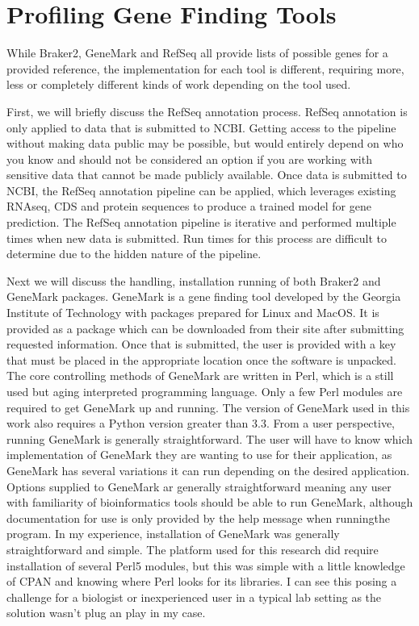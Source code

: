 \section{Profiling Gene Finding Tools}

While Braker2, GeneMark and RefSeq all provide lists of possible genes
for a provided reference, the implementation for each tool is
different, requiring more, less or completely different kinds of work
depending on the tool used.

First, we will briefly discuss the RefSeq annotation process. RefSeq
annotation is only applied to data that is submitted to NCBI. Getting
access to the pipeline without making data public may be possible, but
would entirely depend on who you know and should not be considered an
option if you are working with sensitive data that cannot be made
publicly available. Once data is submitted to NCBI, the RefSeq
annotation pipeline can be applied, which leverages existing RNAseq,
CDS and protein sequences to produce a trained model for gene
prediction. The RefSeq annotation pipeline is iterative and performed
multiple times when new data is submitted. Run times for this process
are difficult to determine due to the hidden nature of the pipeline.

Next we will discuss the handling, installation running of both
Braker2 and GeneMark packages. GeneMark is a gene finding tool
developed by the Georgia Institute of Technology with packages
prepared for Linux and MacOS. It is provided as a package which can be
downloaded from their site after submitting requested
information. Once that is submitted, the user is provided with a key
that must be placed in the appropriate location once the software is
unpacked. The core controlling methods of GeneMark are written in
Perl, which is a still used but aging interpreted programming
language. Only a few Perl modules are required to get GeneMark up and
running. The version of GeneMark used in this work also requires a
Python version greater than 3.3. From a user perspective, running
GeneMark is generally straightforward. The user will have to know
which implementation of GeneMark they are wanting to use for their
application, as GeneMark has several variations it can run depending
on the desired application. Options supplied to GeneMark ar generally
straightforward meaning any user with familiarity of bioinformatics
tools should be able to run GeneMark, although documentation for use
is only provided by the help message when runningthe program. In my
experience, installation of GeneMark was generally straightforward and
simple. The platform used for this research did require installation
of several Perl5 modules, but this was simple with a little knowledge
of CPAN and knowing where Perl looks for its libraries. I can see this
posing a challenge for a biologist or inexperienced user in a typical
lab setting as the solution wasn't plug an play in my case.

